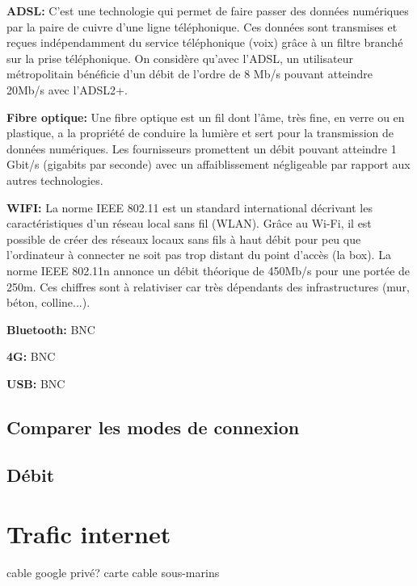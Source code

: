 \documentclass[a4paper,11pt]{article}
\begin{document}
\begin{Form}
\begin{framed}
\end{framed}
\begin{framed}
\textbf{ADSL:} C'est une technologie qui permet de faire passer des données numériques par la paire de cuivre d’une ligne téléphonique. Ces données sont transmises et reçues indépendamment du service téléphonique (voix) grâce à un filtre branché sur la prise téléphonique. On considère qu’avec l’ADSL, un utilisateur métropolitain bénéficie d’un débit de l’ordre de 8 Mb/s pouvant atteindre 20Mb/s avec l'ADSL2+.
\end{framed}
\begin{framed}
\textbf{Fibre optique:} Une fibre optique est un fil dont l’âme, très fine, en verre ou en plastique, a la propriété de conduire la lumière et sert pour la transmission de données numériques. Les fournisseurs promettent un débit pouvant atteindre 1 Gbit/s (gigabits par seconde) avec un affaiblissement négligeable par rapport aux autres technologies.
\end{framed}
\begin{framed}
\textbf{WIFI:} La norme IEEE 802.11 est un standard international décrivant les caractéristiques d'un réseau local sans fil (WLAN). Grâce au Wi-Fi, il est possible de créer des réseaux locaux sans fils à haut débit pour peu que l'ordinateur à connecter ne soit pas trop distant du point d'accès (la box). La norme IEEE 802.11n annonce un débit théorique de 450Mb/s pour une portée de 250m. Ces chiffres sont à relativiser car très dépendants des infrastructures (mur, béton, colline...).
\end{framed}
\begin{framed}
\textbf{Bluetooth:} BNC
\end{framed}
\begin{framed}
\textbf{4G:} BNC
\end{framed}
\begin{framed}
\textbf{USB:} BNC
\end{framed}
\subsection{Comparer les modes de connexion}
\subsection{Débit}
\section{Trafic internet}
cable google privé?
carte cable sous-marins
\end{Form}
\end{document}
